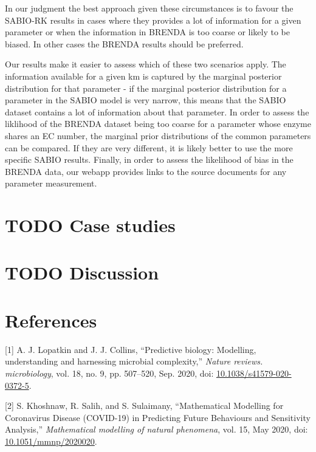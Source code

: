 \documentclass[11pt]{article}
\begin{document}
In our judgment the best approach given these circumstances is to favour the
SABIO-RK results in cases where they provides a lot of information for a given
parameter or when the information in BRENDA is too coarse or likely to be
biased. In other cases the BRENDA results should be preferred.

Our results make it easier to assess which of these two scenarios apply. The
information available for a given km is captured by the marginal posterior
distribution for that parameter - if the marginal posterior distribution for a
parameter in the SABIO model is very narrow, this means that the SABIO dataset
contains a lot of information about that parameter. In order to assess the
liklihood of the BRENDA dataset being too coarse for a parameter whose enzyme
shares an EC number, the marginal prior distributions of the common parameters
can be compared. If they are very different, it is likely better to use the more
specific SABIO results. Finally, in order to assess the likelihood of bias in
the BRENDA data, our webapp provides links to the source documents for any
parameter measurement.

\section{{\bfseries\sffamily TODO} Case studies}
\label{sec:org8f9d1e3}
\section{{\bfseries\sffamily TODO} Discussion}
\label{sec:org7d06580}
\section{References}
\label{sec:orgee11e8b}

\hypertarget{citeproc_bib_item_1}{[1] A. J. Lopatkin and J. J. Collins, “Predictive biology: Modelling, understanding and harnessing microbial complexity,” \textit{Nature reviews. microbiology}, vol. 18, no. 9, pp. 507–520, Sep. 2020, doi: \href{https://doi.org/10.1038/s41579-020-0372-5}{10.1038/s41579-020-0372-5}.}

\hypertarget{citeproc_bib_item_2}{[2] S. Khoshnaw, R. Salih, and S. Sulaimany, “Mathematical Modelling for Coronavirus Disease (COVID-19) in Predicting Future Behaviours and Sensitivity Analysis,” \textit{Mathematical modelling of natural phenomena}, vol. 15, May 2020, doi: \href{https://doi.org/10.1051/mmnp/2020020}{10.1051/mmnp/2020020}.}
\end{document}
